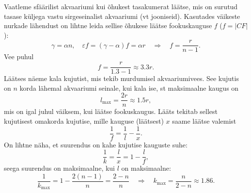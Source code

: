 Vaatleme sfäärilist akvaariumi kui õhukest tasakumerat läätse, mis on surutud tasase küljega vastu sirgeseinalist akvaariumi (vt jooniseid). Kasutades väikeste nurkade lähendust on lihtne leida sellise õhukese läätse fookuskauguse $f$ ($f = |CF|$):
\[
\gamma=\alpha n, \quad \varepsilon f=(\gamma-\alpha) f=\alpha r \quad \Rightarrow \quad f=\frac{r}{n-1}.
\]
Vee puhul
\[
f=\frac{r}{\num{1,3}-\num{1}} \approx \num{3,3} r.
\]
Läätses näeme kala kujutist, mis tekib murdumisel akvaariumivees. See kujutis on $n$ korda lähemal akvaariumi seinale, kui kala ise, st maksimaalne kaugus on
\[
l_{\max }=\frac{2 r}{n} \approx \num{1,5} r,
\]
mis on igal juhul väiksem, kui läätse fookuskaugus. Lääts tekitab sellest kujutisest omakorda kujutise, mille kauguse (läätsest) $x$ saame läätse valemist
\[
\frac{1}{f}=\frac{1}{l}-\frac{1}{x}.
\]
On lihtne näha, et suurendus on kahe kujutise kauguste suhe:
\[
\frac{1}{k}=\frac{l}{x}=1-\frac{l}{f},
\]
seega suurendus on maksimaalne, kui $l$ on maksimaalne:
\[
\frac{1}{k_{\max }}=1-\frac{2(n-1)}{n}=\frac{2-n}{n} \quad\Rightarrow\quad k_{\max }=\frac{n}{2-n} \approx \num{1,86}.
\]
\probend